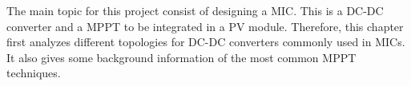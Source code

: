 The main topic for this project consist of designing a MIC. This is a DC-DC converter and a MPPT to be integrated in a PV module. Therefore, this chapter first analyzes different topologies for DC-DC converters commonly used in MICs. It also gives some background information of the most common MPPT techniques.

